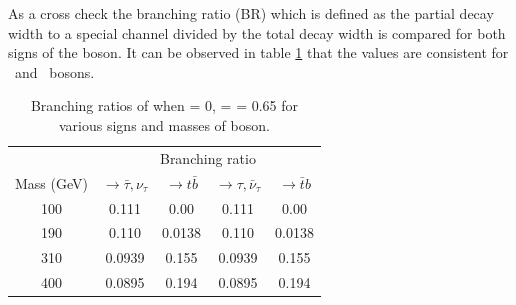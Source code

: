 As a cross check the branching ratio (BR) which is defined as the partial decay width to a special channel divided by the total decay width is compared for both signs of the \wprime boson. 
It can be observed in table \ref{tab:W'BR} that the values are consistent for \wprimep ~and \wprimem ~bosons. 
\begin{table}[htb]
	\centering
	\caption{Branching ratios of \wprime  when \gR = 0, \gL = \gSM = 0.65 for various signs and masses of \wprime boson. \label{tab:W'BR} }
	\begin{tabular}{|c|c|c|c|c|}
		\hline 
		                   & \multicolumn{4}{c|}{Branching ratio}\\\cline{2-5}
		\wprime Mass (GeV) &   \wprimep $\rightarrow \bar{\tau},\nu_\tau $&   \wprimep$\rightarrow  t \bar{b}$ &   \wprimem$\rightarrow \tau,\bar{\nu}_\tau $ &  \wprimem$\rightarrow  \bar{t}b $ \\
		\hline 
		100  & 0.111  & 0.00   & 0.111  & 0.00\\
		190  & 0.110  & 0.0138 & 0.110  & 0.0138\\
		310  & 0.0939 & 0.155  & 0.0939 & 0.155\\
		400  & 0.0895 & 0.194  & 0.0895 & 0.194\\
		\hline
	\end{tabular}
\end{table}

